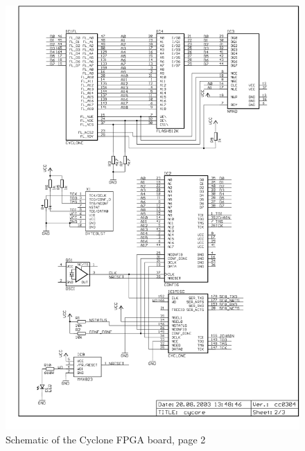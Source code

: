 \begin{figure}
    \centering
    \includegraphics[scale=0.87]{appendix/cycore_p2}
    \caption{Schematic of the Cyclone FPGA board, page 2}
\end{figure}
